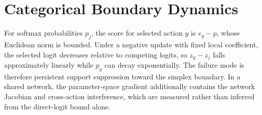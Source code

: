 \section{Categorical Boundary Dynamics}
\label{app:categorical}

For softmax probabilities $p_j$, the score for selected action $y$ is $e_y-p$, whose Euclidean norm is bounded. Under a negative update with fixed local coefficient, the selected logit decreases relative to competing logits, so $z_y-z_j$ falls approximately linearly while $p_y$ can decay exponentially. The failure mode is therefore persistent support suppression toward the simplex boundary. In a shared network, the parameter-space gradient additionally contains the network Jacobian and cross-action interference, which are measured rather than inferred from the direct-logit bound alone.

